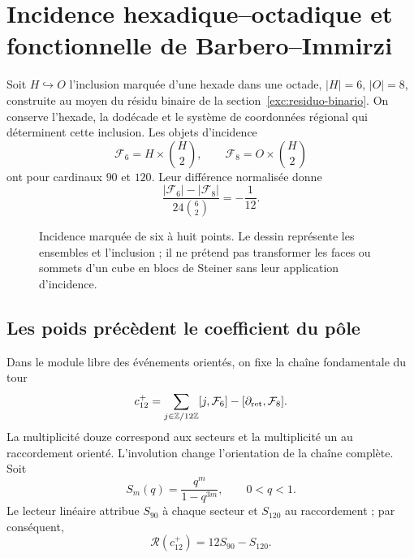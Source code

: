 \section{Incidence hexadique--octadique et fonctionnelle de Barbero--Immirzi}
\label{v:ant:sec:barbero}
Soit $H\hookrightarrow O$ l’inclusion marquée d’une hexade dans une octade,
$|H|=6$, $|O|=8$, construite au moyen du résidu binaire de la
section~\ref{exc:residuo-binario}. On conserve l’hexade, la dodécade
et le système de coordonnées régional qui déterminent cette inclusion.
Les objets d’incidence
\[
\mathcal F_6=H\times\binom H2,\qquad
\mathcal F_8=O\times\binom H2
\]
ont pour cardinaux $90$ et $120$. Leur différence normalisée donne
\[
\frac{|\mathcal F_6|-|\mathcal F_8|}{24\binom62}=-\frac1{12}.
\]
\begin{figure}[htbp]
\centering
{}
\caption{Incidence marquée de six à huit points. Le dessin représente
les ensembles et l'inclusion ; il ne prétend pas transformer les faces ou sommets
d'un cube en blocs de Steiner sans leur application d'incidence.}
\end{figure}

\subsection{Les poids précèdent le coefficient du pôle}
Dans le module libre des événements orientés, on fixe la chaîne
fondamentale du tour
\[
c_{12}^{+}=
\sum_{j\in\mathbb Z/12\mathbb Z}[j,\mathcal F_6]
-[\partial_{\rm ret},\mathcal F_8].
\]
La multiplicité douze correspond aux secteurs et la multiplicité un
au raccordement orienté. L'involution change l'orientation de la chaîne
complète. Soit
\[
S_m(q)=\frac{q^m}{1-q^{3m}},\qquad 0<q<1.
\]
Le lecteur linéaire attribue $S_{90}$ à chaque secteur et $S_{120}$ au raccordement ;
par conséquent,
\[
\mathscr R(c_{12}^{+})=12S_{90}-S_{120}.
\]

